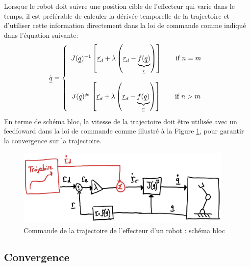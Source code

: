 Lorsque le robot doit suivre une position cible de l'effecteur qui varie dans le temps, il est préférable de calculer la dérivée temporelle de la trajectoire et d'utiliser cette information directement dans la loi de commande comme indiqué dans l'équation suivante:
\begin{align}
\dot{\underline{q}} = \left\{ \begin{array}{c}
 J(\underline{q})^{-1} \left[ \dot{\underline{r}_d} + \lambda \left( \underline{r}_d  - \underbrace{f(\underline{q})}_{\underline{r}} \right) \right] \quad\quad \text{if $n=m$}
 \\ \\
 J(\underline{q})^{\#} \, \left[ \dot{\underline{r}_d} + \lambda \left( \underline{r}_d  - \underbrace{f(\underline{q})}_{\underline{r}} \right) \right]   \quad\quad \text{if $n>m$}
\end{array}
\right.
\end{align}
En terme de schéma bloc, la vitesse de la trajectoire doit être utilisée avec un feedfoward dans la loi de commande comme illustré à la Figure \ref{fig:robotspeedcontroltraj}, pour garantir la convergence sur la trajectoire.
\begin{figure}[H]
	\centering
		\includegraphics[width=0.95\textwidth]{fig/robotspeedcontroltraj.jpg}
	\caption{Commande de la trajectoire de l'effecteur d'un robot : schéma bloc}
	\label{fig:robotspeedcontroltraj}
\end{figure}


\subsection{Convergence}

